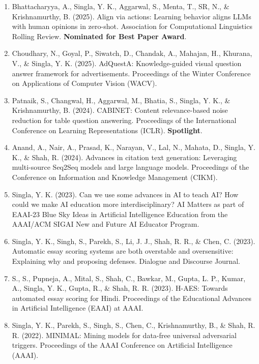 \begin{enumerate}
    \item Bhattacharyya, A., Singla, Y. K., Aggarwal, S., Menta, T., SR, N., \& Krishnamurthy, B. (2025). Align via actions: Learning behavior aligns LLMs with human opinions in zero-shot. Association for Computational Linguistics Rolling Review. \textbf{Nominated for Best Paper Award}.

    \item Choudhary, N., Goyal, P., Siwatch, D., Chandak, A., Mahajan, H., Khurana, V., \& Singla, Y. K. (2025). AdQuestA: Knowledge-guided visual question answer framework for advertisements. Proceedings of the Winter Conference on Applications of Computer Vision (WACV).

    \item Patnaik, S., Changwal, H., Aggarwal, M., Bhatia, S., Singla, Y. K., \& Krishnamurthy, B. (2024). CABINET: Content relevance-based noise reduction for table question answering. Proceedings of the International Conference on Learning Representations (ICLR). \textbf{Spotlight}.

    \item Anand, A., Nair, A., Prasad, K., Narayan, V., Lal, N., Mahata, D., Singla, Y. K., \& Shah, R. (2024). Advances in citation text generation: Leveraging multi-source Seq2Seq models and large language models. Proceedings of the Conference on Information and Knowledge Management (CIKM).

    \item Singla, Y. K. (2023). Can we use some advances in AI to teach AI? How could we make AI education more interdisciplinary? AI Matters as part of EAAI-23 Blue Sky Ideas in Artificial Intelligence Education from the AAAI/ACM SIGAI New and Future AI Educator Program.

    \item Singla, Y. K., Singh, S., Parekh, S., Li, J. J., Shah, R. R., \& Chen, C. (2023). Automatic essay scoring systems are both overstable and oversensitive: Explaining why and proposing defenses. Dialogue and Discourse Journal.

    \item S., S., Pupneja, A., Mital, S., Shah, C., Bawkar, M., Gupta, L. P., Kumar, A., Singla, Y. K., Gupta, R., \& Shah, R. R. (2023). H-AES: Towards automated essay scoring for Hindi. Proceedings of the Educational Advances in Artificial Intelligence (EAAI) at AAAI.

    \item Singla, Y. K., Parekh, S., Singh, S., Chen, C., Krishnamurthy, B., \& Shah, R. R. (2022). MINIMAL: Mining models for data-free universal adversarial triggers. Proceedings of the AAAI Conference on Artificial Intelligence (AAAI).


\end{enumerate}
